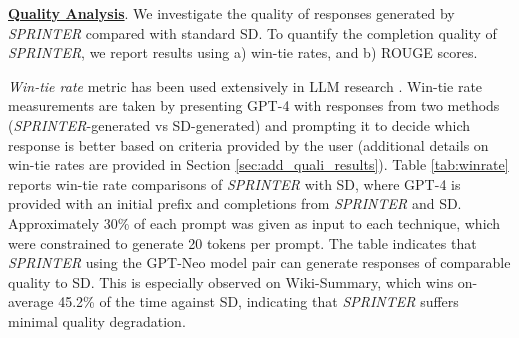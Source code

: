 \documentclass{article}
\newcommand{\revision}[1]{{\color{black} #1}}
\theoremstyle{plain}
\theoremstyle{definition}
\theoremstyle{remark}
\begin{document}
\textbf{\underline{Quality Analysis}}. We investigate the quality of responses generated by \textit{SPRINTER} compared with standard SD. To quantify the completion quality of \textit{SPRINTER}, we report results using a) win-tie rates, and b) ROUGE scores. 

\textit{Win-tie rate} metric has been used extensively in LLM research \cite{rafailov2024direct,shen2024learning}. Win-tie rate measurements are taken by presenting GPT-4 with responses from two methods (\textit{SPRINTER}-generated vs SD-generated) and prompting it to decide which response is better based on criteria provided by the user (additional details on win-tie rates are provided in Section \ref{sec:add_quali_results}).   Table \ref{tab:winrate} reports win-tie rate comparisons of \textit{SPRINTER} with SD,  where  GPT-4 is provided with an initial prefix and completions from \textit{SPRINTER} and SD. \revision{Approximately 30\% of each prompt was given as input to each technique, which were constrained to generate 20 tokens per prompt.} The table indicates that \textit{SPRINTER} using the GPT-Neo model pair can generate responses of comparable quality to SD. This is especially observed on Wiki-Summary, which wins on-average 45.2\% of the time against SD, indicating that \textit{SPRINTER} suffers minimal quality degradation. %
\end{document}
